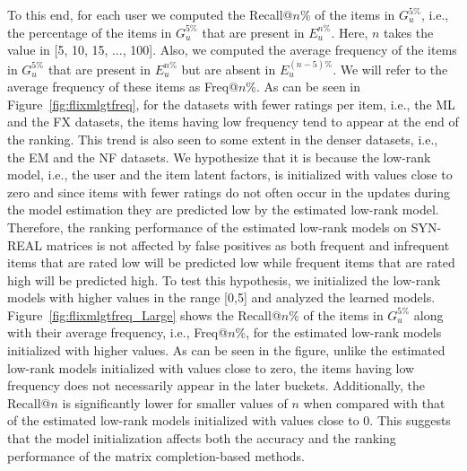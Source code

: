 To this end, for each user we computed the Recall@$n$\% of the items in $G_{u}^{5\%}$, 
i.e., the percentage of the items in $G_{u}^{5\%}$ that are present in
$E_{u}^{n\%}$. Here, $n$ takes the value in [5, 10, 15, ..., 100]. 
Also, we computed the average frequency of the items in
$G_{u}^{5\%}$ that are present in $E_{u}^{n\%}$ but are absent in
$E_{u}^{(n-5)\%}$.  
We will refer to the average frequency of these items as Freq@$n$\%.
As can be seen in Figure~\ref{fig:flixmlgtfreq}, for the datasets with fewer ratings per item, i.e.,
the ML and the FX datasets, the items having low frequency tend to appear
at the end of the ranking. This trend is also seen to some extent in the denser
datasets, i.e., the EM and the NF datasets.
We hypothesize that it is because the low-rank model, i.e., the user and the item latent factors, is
initialized with values close to zero and since items with fewer ratings do not often
occur in the updates during the model estimation they are predicted low
by the estimated low-rank model. 
Therefore, the ranking performance of the estimated low-rank models on SYN-REAL
matrices is not affected by false
positives as both frequent and infrequent items that are rated low will be predicted low
while frequent items that are rated high will be predicted high. 
To test this hypothesis, we initialized the low-rank models with higher values in the
range [0,5] and analyzed the learned models.
Figure~\ref{fig:flixmlgtfreq_Large} shows the Recall@$n\%$ of the items in
$G_{u}^{5\%}$ along with their average frequency, i.e., Freq@$n$\%, for the
estimated low-rank models initialized with higher values.
As can be seen in the figure, unlike the estimated low-rank models
initialized with values close to zero, the items having low frequency does not
necessarily appear in the later buckets.
Additionally, the Recall@$n$ is significantly lower for smaller values of $n$ when
compared with that of the estimated low-rank models initialized with values close to 0. 
This suggests that the model initialization affects both the accuracy and the
ranking performance of the matrix completion-based methods.

